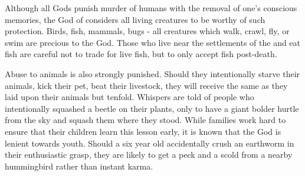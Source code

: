\documentclass[blue]{GL2020}
\begin{document}
Although all Gods punish murder of humans with the removal of one's conscious memories, the God of \pFarm{} considers all living creatures to be worthy of such protection.  Birds, fish, mammals, bugs - all creatures which walk, crawl, fly, or swim are precious to the God.  Those \pFarm{} who live near the settlements of the \pShip{} and eat fish are careful not to trade for live fish, but to only accept fish post-death.

Abuse to animals is also strongly punished.  Should they intentionally starve their animals, kick their pet, beat their livestock, they will receive the same as they laid upon their animals but tenfold.  Whispers are told of people who intentionally squashed a beetle on their plants, only to have a giant bolder hurtle from the sky and squash them where they stood.  While families work hard to ensure that their children learn this lesson early, it is known that the God is lenient towards youth.  Should a six year old accidentally crush an earthworm in their enthusiastic grasp, they are likely to get a peck and a scold from a nearby hummingbird rather than instant karma. 
\end{document}
